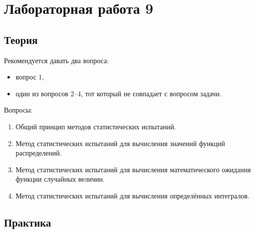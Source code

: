 \documentclass[a4paper,12pt]{article}
\begin{document}
\section*{Лабораторная работа 9}

\subsection*{Теория}

Рекомендуется давать два вопроса:
\begin{itemize}
      \item вопрос 1,
      \item один из вопросов 2--4, тот который не совпадает с вопросом задачи.
\end{itemize}

Вопросы:
\begin{enumerate}
      \item Общий принцип методов статистических испытаний.
      \item Метод статистических испытаний для вычисления значений функций распределений.
      \item Метод статистических испытаний для вычисления математического ожидания функции случайных величин.
      \item Метод статистических испытаний для вычисления определённых интегралов.
\end{enumerate}

\subsection*{Практика}
\end{document}
